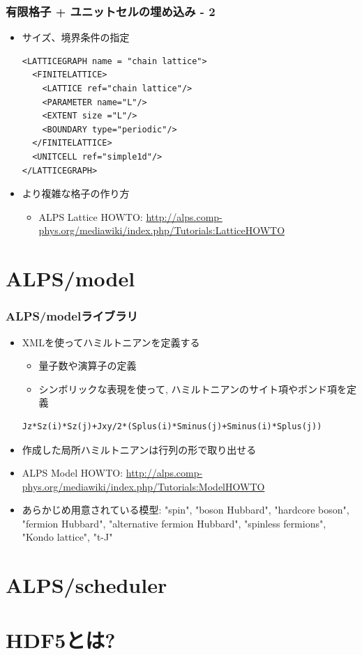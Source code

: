 \begin{frame}[t,fragile]
  \frametitle{有限格子 + ユニットセルの埋め込み - 2}
  \begin{itemize}
  \item サイズ、境界条件の指定
    \begin{lstlisting}
<LATTICEGRAPH name = "chain lattice">
  <FINITELATTICE>
    <LATTICE ref="chain lattice"/>
    <PARAMETER name="L"/>
    <EXTENT size ="L"/>
    <BOUNDARY type="periodic"/>
  </FINITELATTICE>
  <UNITCELL ref="simple1d"/>
</LATTICEGRAPH>
\end{lstlisting}
  \item より複雑な格子の作り方
    \begin{itemize}
    \item ALPS Lattice HOWTO: \url{http://alps.comp-phys.org/mediawiki/index.php/Tutorials:LatticeHOWTO}
    \end{itemize}
  \end{itemize}
\end{frame}

\section{ALPS/model}

\begin{frame}[t,fragile]
  \frametitle{ALPS/modelライブラリ}
  \begin{itemize}
  \item XMLを使ってハミルトニアンを定義する
    \begin{itemize}  
    \item 量子数や演算子の定義
    \item シンボリックな表現を使って, ハミルトニアンのサイト項やボンド項を定義
    \end{itemize}
    \begin{lstlisting}
Jz*Sz(i)*Sz(j)+Jxy/2*(Splus(i)*Sminus(j)+Sminus(i)*Splus(j))
\end{lstlisting}
  \item 作成した局所ハミルトニアンは行列の形で取り出せる
  \item ALPS Model HOWTO: \url{http://alps.comp-phys.org/mediawiki/index.php/Tutorials:ModelHOWTO}
  \item あらかじめ用意されている模型: "spin", "boson Hubbard", "hardcore boson", "fermion Hubbard", "alternative fermion Hubbard", "spinless fermions", "Kondo lattice", "t-J"
  \end{itemize}
\end{frame}

\section{ALPS/scheduler}
\section{HDF5とは?}


